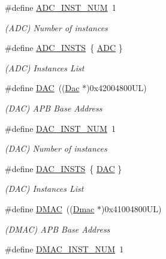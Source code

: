 \begin{DoxyCompactItemize}
\#define \mbox{\hyperlink{group___s_a_m_d21_g15_l__base_gac539e8e2e65134854344ceb66b3bab64}{A\+D\+C\+\_\+\+I\+N\+S\+T\+\_\+\+N\+UM}}~1
\begin{DoxyCompactList}\small\item\em (A\+DC) Number of instances \end{DoxyCompactList}\item 
\#define \mbox{\hyperlink{group___s_a_m_d21_g15_l__base_gac8cdf23f347cb42af81b527251ff1dd5}{A\+D\+C\+\_\+\+I\+N\+S\+TS}}~\{ \mbox{\hyperlink{group___s_a_m_d21_j18_a__base_ga54d148b91f3d356713f7e367a2243bea}{A\+DC}} \}
\begin{DoxyCompactList}\small\item\em (A\+DC) Instances List \end{DoxyCompactList}\item 
\#define \mbox{\hyperlink{group___s_a_m_d21_g15_l__base_ga4aa2a4ab86ce00c23035e5cee2e7fc7e}{D\+AC}}~((\mbox{\hyperlink{struct_dac}{Dac}}      $\ast$)0x42004800\+U\+L)
\begin{DoxyCompactList}\small\item\em (D\+AC) A\+PB Base Address \end{DoxyCompactList}\item 
\#define \mbox{\hyperlink{group___s_a_m_d21_g15_l__base_ga1aa937dc9f0c19c37cee542da2e5fcb4}{D\+A\+C\+\_\+\+I\+N\+S\+T\+\_\+\+N\+UM}}~1
\begin{DoxyCompactList}\small\item\em (D\+AC) Number of instances \end{DoxyCompactList}\item 
\#define \mbox{\hyperlink{group___s_a_m_d21_g15_l__base_ga41e76b9489ebc119fc3b8a13a7b98040}{D\+A\+C\+\_\+\+I\+N\+S\+TS}}~\{ \mbox{\hyperlink{group___s_a_m_d21_j18_a__base_ga4aa2a4ab86ce00c23035e5cee2e7fc7e}{D\+AC}} \}
\begin{DoxyCompactList}\small\item\em (D\+AC) Instances List \end{DoxyCompactList}\item 
\#define \mbox{\hyperlink{group___s_a_m_d21_g15_l__base_ga9f8bc0e77445ff4bc6fc2db5c2828667}{D\+M\+AC}}~((\mbox{\hyperlink{struct_dmac}{Dmac}}     $\ast$)0x41004800\+U\+L)
\begin{DoxyCompactList}\small\item\em (D\+M\+AC) A\+PB Base Address \end{DoxyCompactList}\item 
\#define \mbox{\hyperlink{group___s_a_m_d21_g15_l__base_ga31ad3fc52c58ae5ac7b44d6cf3d950f5}{D\+M\+A\+C\+\_\+\+I\+N\+S\+T\+\_\+\+N\+UM}}~1

\end{DoxyCompactItemize}
